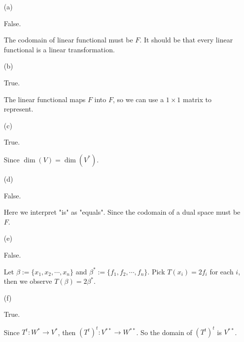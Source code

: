 \begin{Exercise}
	\begin{enumerate}[(a)]
		\item[(a)]
		\begin{answer}
			False.
		\end{answer}
		\begin{solution}
			The codomain of linear functional must be $F$. It should be that every linear functional is a linear transformation.
		\end{solution}
		
		\item[(b)]
		\begin{answer}
			True.
		\end{answer}
		\begin{solution}
			The linear functional maps $F$ into $F$, so we can use a $1\times 1$ matrix to represent.
		\end{solution}
		
		\item[(c)]
		\begin{answer}
			True.
		\end{answer}
		\begin{solution}
			Since $\dim(V) = \dim(V^*)$.
		\end{solution}
		
		\item[(d)]
		\begin{answer}
			False.
		\end{answer}
		\begin{solution}
			Here we interpret "is" as "equals". Since the codomain of a dual space must be $F$.
		\end{solution}
		
		\item[(e)]
		\begin{answer}
			False.
		\end{answer}
		\begin{solution}
			Let $\beta := \{x_1,x_2,\cdots,x_n\}$ and $\beta^* := \{f_1,f_2,\cdots,f_n\}$. Pick $T(x_i) = 2f_i$ for each $i$, then we observe $T(\beta) = 2\beta^*$.
		\end{solution}
		
		\item[(f)]
		\begin{answer}
			True.
		\end{answer}
		\begin{solution}
			Since $T^t:W^*\to V^*$, then $(T^t)^t:V^{**}\to W^{**}$. So the domain of $(T^t)^t$ is $V^{**}$.
		\end{solution}
		

\end{enumerate}
\end{Exercise}
